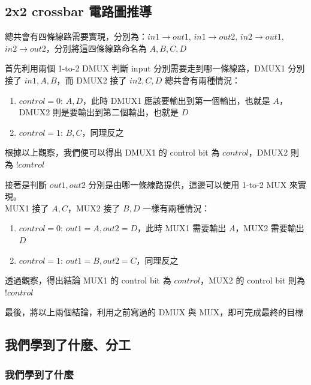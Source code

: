 \documentclass[10.5pt,compsoc,UTF8]{CjC}
\theoremstyle{mystyle}
\begin{document}
\subsection{2x2 crossbar 電路圖推導}\label{sec:crossbar}

總共會有四條線路需要實現，分別為：$in1 \rightarrow out1$, $in1 \rightarrow out2$, $in2 \rightarrow out1$, $in2 \rightarrow out2$，分別將這四條線路命名為 $A, B, C, D$
\par
首先利用兩個 1-to-2 DMUX 判斷 input 分別需要走到哪一條線路，DMUX1 分別接了 $in1, A, B$，而 DMUX2 接了 $in2, C, D$ 總共會有兩種情況：
\begin{enumerate}
    \item $control = 0$: $A, D$，此時 DMUX1 應該要輸出到第一個輸出，也就是 $A$，DMUX2 則是要輸出到第二個輸出，也就是 $D$
    \item $control = 1$: $B, C$，同理反之
\end{enumerate}
根據以上觀察，我們便可以得出 DMUX1 的 control bit 為 $control$，DMUX2 則為 $!control$
\par

接著是判斷 $out1, out2$ 分別是由哪一條線路提供，這邊可以使用 1-to-2 MUX 來實現。\\
MUX1 接了 $A, C$，MUX2 接了 $B, D$ 一樣有兩種情況：
\begin{enumerate}
    \item $control = 0$: $out1 = A, out2 = D$，此時 MUX1 需要輸出 $A$，MUX2 需要輸出 $D$
    \item $control = 1$: $out1 = B, out2 = C$，同理反之
\end{enumerate}
透過觀察，得出結論 MUX1 的 control bit 為 $control$，MUX2 的 control bit 則為 $!control$

\par

最後，將以上兩個結論，利用之前寫過的 DMUX 與 MUX，即可完成最終的目標

\subsection{我們學到了什麼、分工}

\subsubsection*{我們學到了什麼}
\end{document}
